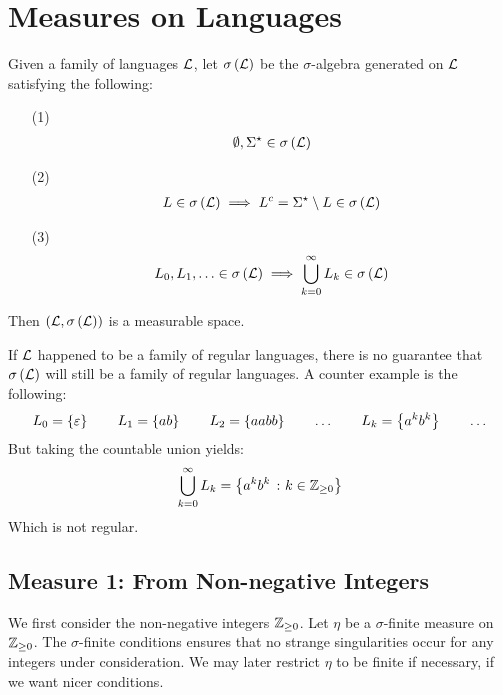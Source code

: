 \section{Measures on Languages}
Given a family of languages \(\mathcal{L}\),
let \(\sigma\left(\mathcal{L}\right)\) be the \(\sigma\)-algebra generated on
\(\mathcal{L}\) satisfying the following:

\begin{enumerate}
  \item[(1)]
    \begin{align*}
      \emptyset, \Sigma^\star \in \sigma\left(\mathcal{L}\right)
    \end{align*}

  \item[(2)]
    \begin{align*}
      L \in \sigma\left(\mathcal{L}\right)
        \implies
          L^c = \Sigma^\star \setminus L \in \sigma\left(\mathcal{L}\right)
    \end{align*}

  \item[(3)]
    \begin{align*}
      L_0, L_1, \ldots \in \sigma\left(\mathcal{L}\right)
        \implies
          \bigcup_{k = 0}^{\infty} L_k \in \sigma\left(\mathcal{L}\right)
    \end{align*}

\end{enumerate}

Then \(\left(\mathcal{L}, \sigma\left(\mathcal{L}\right)\right)\) is a measurable space.

\begin{remark}
If \(\mathcal{L}\) happened to be a family of regular languages,
there is no guarantee that \(\sigma\left(\mathcal{L}\right)\)
will still be a family of regular languages.
A counter example is the following:
\begin{align*}
  L_0 = \left\{\varepsilon\right\}
  \qquad
  L_1 = \left\{ab\right\}
  \qquad
  L_2 = \left\{aabb\right\}
  \qquad
  \ldots
  \qquad
  L_k = \left\{a^k b^k\right\}
  \qquad
  \ldots
\end{align*}
But taking the countable union yields:
\begin{align*}
  \bigcup_{k = 0}^{\infty} L_k = \left\{a^k b^k \ \colon k \in \mathbb{Z}_{\geq 0}\right\}
\end{align*}
Which is not regular.
\end{remark}


\subsection{Measure 1: From Non-negative Integers}
We first consider the non-negative integers \(\mathbb{Z}_{\geq 0}\).
Let \(\eta\) be a \(\sigma\)-finite measure on \(\mathbb{Z}_{\geq 0}\).
The \(\sigma\)-finite conditions ensures that no strange singularities
occur for any integers under consideration.
We may later restrict \(\eta\) to be finite if necessary,
if we want nicer conditions.


